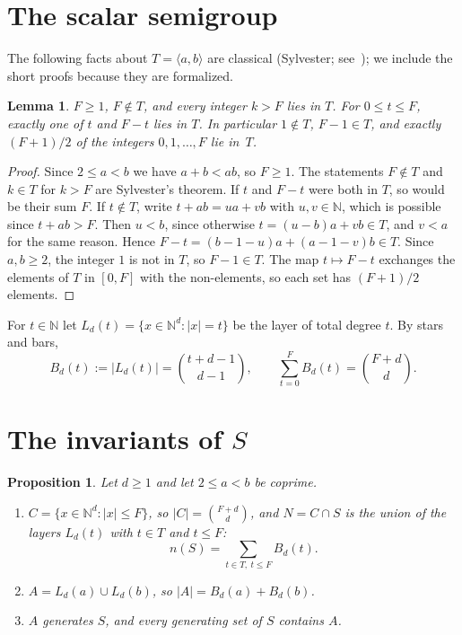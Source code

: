\documentclass[11pt]{article}
\newtheorem{lemma}{Lemma}
\newtheorem{proposition}{Proposition}
\theoremstyle{definition}
\theoremstyle{remark}
\newcommand{\N}{\mathbb N}
\newcommand{\Bd}[2]{B_{#1}(#2)}
\begin{document}
\section{The scalar semigroup}\label{sec:scalar}

The following facts about $T=\langle a,b\rangle$ are classical (Sylvester;
see~\cite{rg}); we include the short proofs because they are formalized.

\begin{lemma}\label{lem:reflect}
$F\ge1$, $F\notin T$, and every integer $k>F$ lies in $T$. For $0\le t\le F$,
exactly one of $t$ and $F-t$ lies in $T$. In particular $1\notin T$,
$F-1\in T$, and exactly $(F+1)/2$ of the integers $0,1,\dots,F$ lie in~$T$.
\end{lemma}

\begin{proof}
Since $2\le a<b$ we have $a+b<ab$, so $F\ge1$. The statements $F\notin T$ and
$k\in T$ for $k>F$ are Sylvester's theorem. If $t$ and $F-t$ were both in $T$,
so would be their sum $F$. If $t\notin T$, write $t+ab=ua+vb$ with $u,v\in\N$,
which is possible since $t+ab>F$. Then $u<b$, since otherwise
$t=(u-b)a+vb\in T$, and $v<a$ for the same reason. Hence
$F-t=(b-1-u)a+(a-1-v)b\in T$. Since $a,b\ge2$, the integer $1$ is not in $T$,
so $F-1\in T$. The map $t\mapsto F-t$ exchanges the elements of $T$ in
$[0,F]$ with the non-elements, so each set has $(F+1)/2$ elements.
\end{proof}

For $t\in\N$ let $L_d(t)=\{x\in\N^d: |x|=t\}$ be the layer of total degree $t$.
By stars and bars,
\[
\Bd{d}{t}:=|L_d(t)|=\binom{t+d-1}{d-1},\qquad
\sum_{t=0}^{F}\Bd{d}{t}=\binom{F+d}{d}.
\]

\section{\texorpdfstring{The invariants of $S$}{The invariants of S}}\label{sec:invariants}

\begin{proposition}\label{prop:invariants}
Let $d\ge1$ and let $2\le a<b$ be coprime.
\begin{enumerate}
\item[(a)] $C=\{x\in\N^d: |x|\le F\}$, so $|C|=\binom{F+d}{d}$, and
$N=C\cap S$ is the union of the layers $L_d(t)$ with $t\in T$ and $t\le F$:
\[
n(S)=\sum_{t\in T,\ t\le F}\Bd{d}{t}.
\]
\item[(b)] $A=L_d(a)\cup L_d(b)$, so $|A|=\Bd{d}{a}+\Bd{d}{b}$.
\item[(c)] $A$ generates $S$, and every generating set of $S$ contains $A$.
\end{enumerate}
\end{proposition}
\end{document}
